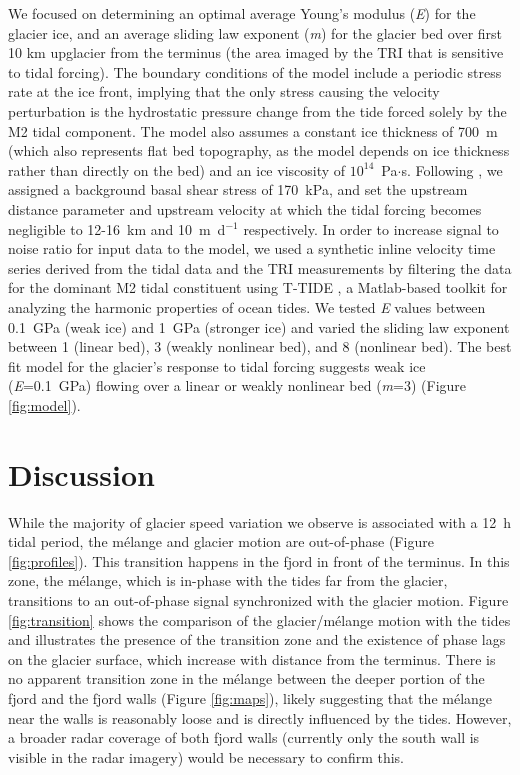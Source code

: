We focused on determining an optimal average Young's modulus (\textit{E}) for the glacier ice, and an average sliding law exponent (\textit{m}) for the glacier bed over first 10 km upglacier from the terminus (the area imaged by the TRI that is sensitive to tidal forcing).   The boundary conditions of the model include a periodic stress rate at the ice front, implying that the only stress causing the velocity perturbation is the hydrostatic pressure change from the tide forced solely by the M2 tidal component.  The model also assumes a constant ice thickness of 700~m (which also represents flat bed topography, as the model depends on ice thickness rather than directly on the bed) and an ice viscosity of $10^{14}$~Pa$\cdot$s. Following \citet{verger2011tidewater}, we assigned a background basal shear stress of 170~kPa, and set the upstream distance parameter and upstream velocity at which the tidal forcing becomes negligible to 12-16~km and 10~m~d$^{-1}$ respectively. In order to increase signal to noise ratio for input data to the model, we used a synthetic inline velocity time series derived from the tidal data and the TRI measurements by filtering the data for the dominant M2 tidal constituent using T-TIDE \citep{pawlowicz2002classical}, a Matlab-based toolkit for analyzing the harmonic properties of ocean tides.  We tested \textit{E} values between 0.1~GPa (weak ice) and 1~GPa (stronger ice) and varied the sliding law exponent between 1 (linear bed), 3 (weakly nonlinear bed), and 8 (nonlinear bed). The best fit model for the glacier's response to tidal forcing suggests weak ice (\textit{E}=0.1~GPa) flowing over a linear or weakly nonlinear bed (\textit{m}=3) (Figure \ref{fig:model}). 



\section{Discussion}
While the majority of glacier speed variation we observe is associated with a 12~h tidal period, the m\'elange and glacier motion are out-of-phase (Figure \ref{fig:profiles}). This transition happens in the fjord in front of the terminus. In this zone, the m\'elange, which is in-phase with the tides far from the glacier, transitions to an out-of-phase signal synchronized with the glacier motion. Figure \ref{fig:transition} shows the comparison of the glacier/m\'elange motion with the tides and illustrates the presence of the transition zone and the existence of phase lags on the glacier surface, which increase with distance from the terminus. There is no apparent transition zone in the m\'elange between the deeper portion of the fjord and the fjord walls (Figure \ref{fig:maps}), likely suggesting that the m\'elange near the walls is reasonably loose and is directly influenced by the tides. However, a broader radar coverage of both fjord walls (currently only the south wall is visible in the radar imagery) would be necessary to confirm this. 


